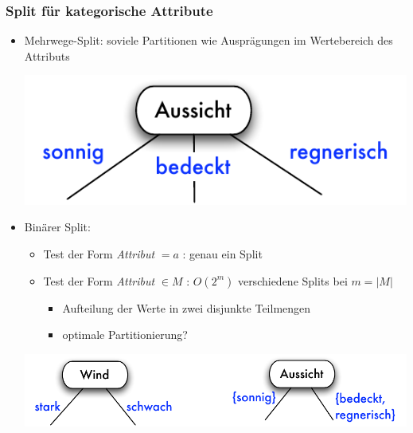 \begin{frame}
\frametitle{Split für kategorische Attribute}

\begin{itemize}
\item Mehrwege-Split: soviele Partitionen wie Ausprägungen im
  Wertebereich des Attributs
\begin{center}
\includegraphics[scale=.5]{fig7/split-kat1.pdf}
\end{center}
\item Binärer Split:
\begin{itemize}
\item Test der Form \emph{Attribut} $= a$ : genau ein Split
\item Test der Form \emph{Attribut} $\in M$ : $O(2^m)$ verschiedene
  Splits bei $m=|M|$
\begin{itemize}
\item Aufteilung der Werte in zwei disjunkte Teilmengen
\item optimale Partitionierung?
\end{itemize}
\end{itemize}
\begin{center}
\includegraphics[scale=.5]{fig7/split-kat2.pdf}
\end{center}
\end{itemize}

\end{frame}


